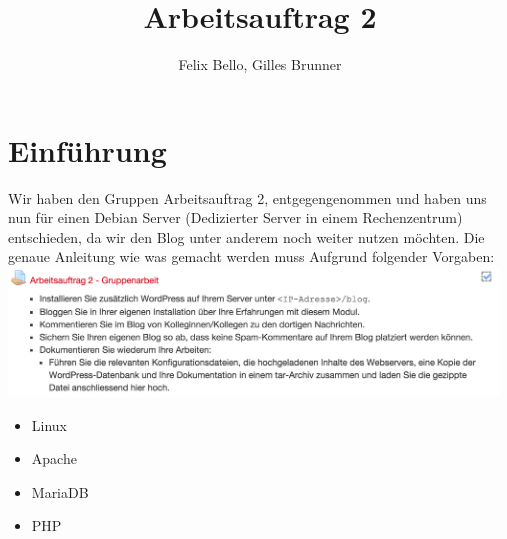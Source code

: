 \documentclass{article}
\author{Felix Bello, Gilles Brunner}
\title{Arbeitsauftrag 2}
\begin{document}
	\maketitle
	\section{Einführung}
	Wir haben den Gruppen Arbeitsauftrag 2, entgegengenommen und haben uns nun für einen Debian Server (Dedizierter Server in einem Rechenzentrum) entschieden, da wir den Blog unter anderem noch weiter nutzen möchten. Die genaue Anleitung wie was gemacht werden muss Aufgrund folgender Vorgaben:
	\newline
	\includegraphics[width=13cm]{../Pics/00-vorgaben}
	\newline
	\begin{itemize}
		\item[\Square] Linux
		\item[\Square] Apache
		\item[\Square] MariaDB
		\item[\Square] PHP
	\end{itemize}
\end{document}
